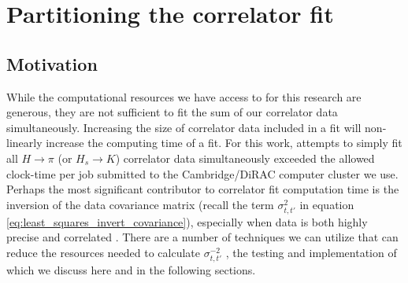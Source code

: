 



\section{Partitioning the correlator fit}\label{sec:partitioned_fitting_technique}
\subsection{Motivation}
While the computational resources we have access to for this research are generous, they are not sufficient to fit the sum of our correlator data simultaneously.  Increasing the size of correlator data included in a fit will non-linearly increase the computing time of a fit.  For this work, attempts to simply fit all $H\rightarrow\pi$ (or $H_s\rightarrow K$) correlator data simultaneously exceeded the allowed clock-time per job submitted to the Cambridge/DiRAC computer cluster we use. Perhaps the most significant contributor to correlator fit computation time is the inversion of the data covariance matrix (recall the term $\sigma^2_{t,t'}$ in equation \ref{eq:least_squares_invert_covariance}), especially when data is both highly precise and correlated \cite{PhysRevD.43.196, DRUMMOND1993271, KILCUP1994350, PhysRevD.51.3745}. There are a number of techniques we can utilize that can reduce the resources needed to calculate $\sigma^{-2}_{t,t'}$ \cite{Yoon2013}, the testing and implementation of which we discuss here and in the following sections. 

